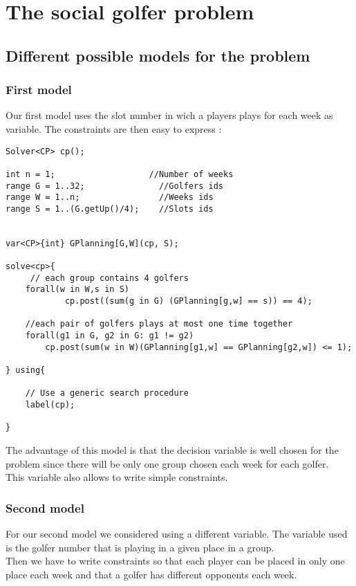 \documentclass{eplDoc}
\begin{document}
\maketitle
\newpage

\section{The social golfer problem}

\subsection{Different possible models for the problem}
\subsubsection{First model}
Our first model uses the slot number in wich a players plays for each week as variable. The constraints are then easy to express : 
\begin{lstlisting}
Solver<CP> cp();

int n = 1;                   //Number of weeks
range G = 1..32;               //Golfers ids
range W = 1..n;                //Weeks ids
range S = 1..(G.getUp()/4);    //Slots ids


var<CP>{int} GPlanning[G,W](cp, S);   

solve<cp>{
     // each group contains 4 golfers
    forall(w in W,s in S)
            cp.post((sum(g in G) (GPlanning[g,w] == s)) == 4);

    //each pair of golfers plays at most one time together
    forall(g1 in G, g2 in G: g1 != g2)
        cp.post(sum(w in W)(GPlanning[g1,w] == GPlanning[g2,w]) <= 1);

} using{

    // Use a generic search procedure
    label(cp);

}
\end{lstlisting}

The advantage of this model is that the decision variable is well chosen for the problem since there will be only one group chosen each week for each golfer. \\ 
This variable also allows to write simple constraints. \\ 

\subsubsection{Second model}
For our second model we considered using a different variable. The variable used is the golfer number that is playing in a given place in a group. \\ 
Then we have to write constraints so that each player can be placed in only one place each week and that a golfer has different opponents each week. 
\end{document}
